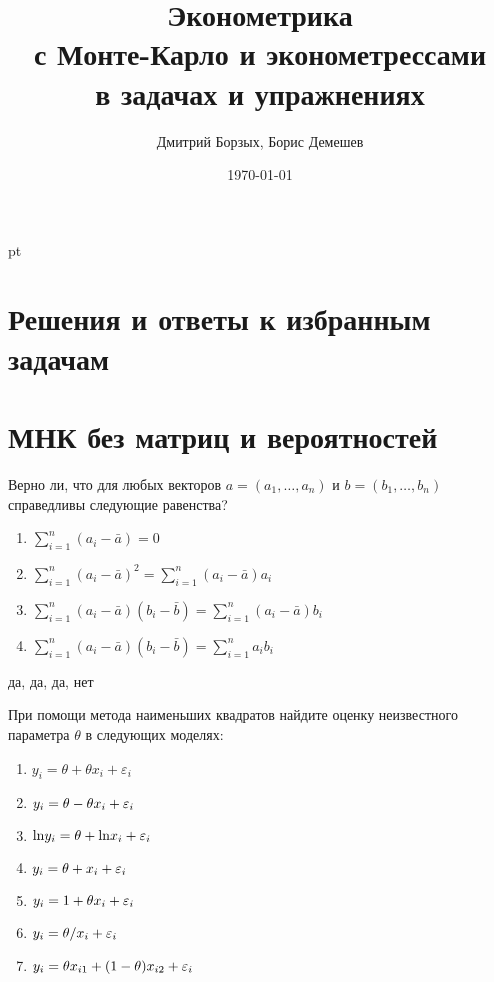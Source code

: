 \documentclass[pdftex,11pt,openany]{book}\usepackage[]{graphicx}\usepackage[]{color}
\title{Эконометрика \\ {\small с Монте-Карло и эконометрессами} \\ в задачах и упражнениях}
\author{Дмитрий Борзых, Борис Демешев}
\date{\today}
\begin{document}


 pt %









\chapter{Решения и ответы к избранным задачам}

\solutiononly




\chapter{МНК без матриц и вероятностей}

\begin{problem}
 Верно ли, что для любых векторов $a = (a_1,\dots,a_n)$ и $b = (b_1,\dots,b_n)$ справедливы следующие равенства?
\begin{enumerate}
\item $\sum_{i=1}^n {(a_i-\bar a)} = 0$
\item $\sum_{i=1}^n {(a_i-\bar a)^2} = \sum_{i=1}^n {(a_i-\bar a)a_i}$
\item $\sum_{i=1}^n {(a_i-\bar a)(b_i-\bar b)} = \sum_{i=1}^n {(a_i-\bar a)b_i}$
\item $\sum_{i=1}^n {(a_i-\bar a)(b_i-\bar b)} = \sum_{i=1}^n {a_i b_i}$
\end{enumerate}
\end{problem}

\begin{solution}
 да, да, да, нет
\end{solution}




\begin{problem}
 При помощи метода наименьших квадратов найдите оценку неизвестного параметра $\theta$ в следующих моделях:

\begin{enumerate}
\item $y_i = \theta + \theta x_i + \varepsilon_i$
\item $y_i = \theta - \theta x_i + \varepsilon_i$
\item $\text{ln} y_i = \theta + \text{ln} x_i + \varepsilon_i$
\item $y_i = \theta + x_i + \varepsilon_i$
\item $y_i = 1 + \theta x_i + \varepsilon_i$
\item $y_i = \theta / x_i + \varepsilon_i$
\item $y_i = \theta x_{i1} + (1-\theta)x_{i2}+\varepsilon_i$
\end{enumerate}
\end{problem}
\end{document}
